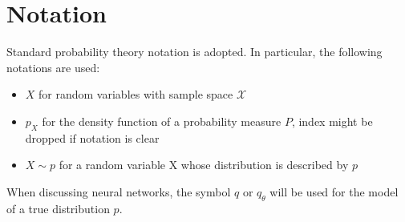 

\section*{Notation}
Standard probability theory notation is adopted. In particular, the following notations are used:
\begin{itemize}
    \item   $X$ for random variables with sample space $\mathcal{X}$  
    \item   $p_X$ for the density function of a probability measure $P$, index might be dropped if notation is clear
    \item   $X \sim p$ for a random variable X whose distribution is described by $p$
\end{itemize}
When discussing neural networks, the symbol $q$ or $q_\theta$ will be used for the model of a true distribution $p$.